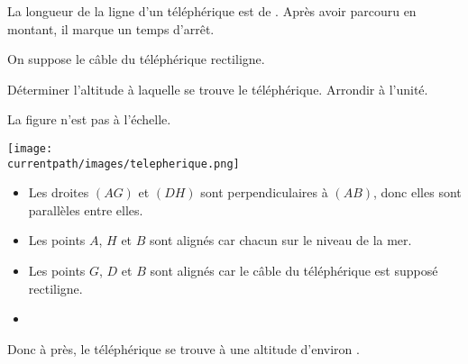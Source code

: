 \begin{exercice*}
    La longueur de la ligne d'un téléphérique est de . Après avoir parcouru  en montant,
    il marque un temps d'arrêt.

    On suppose le câble du téléphérique rectiligne.

    \vspace*{10mm}
    Déterminer l'altitude à laquelle se trouve le téléphérique. Arrondir à l'unité.

    \begin{minipage}{1\linewidth}
    \begin{center}
        La figure n'est pas à l'échelle.

        \texttt{[image: \\currentpath/images/telepherique.png]}    
    \end{center}
    \end{minipage}
    

\end{exercice*}
\begin{corrige}
    \begin{itemize}
        \item Les droites $(AG)$ et $(DH)$ sont perpendiculaires à $(AB)$, donc elles sont parallèles entre elles.
        \item Les points $A$, $H$ et $B$ sont alignés car chacun sur le niveau de la mer.
        \item Les points $G$, $D$ et $B$ sont alignés car le câble du téléphérique est supposé rectiligne.
        \item {}    
    \end{itemize}

    Donc à  près, le téléphérique se trouve à une altitude d'environ .
\end{corrige}

